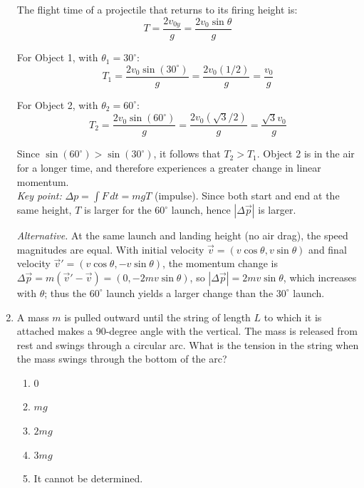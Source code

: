 \documentclass[12pt, a4paper]{article}
\begin{document}
\begin{CJK*}{UTF8}{gbsn}
\begin{enumerate}[itemsep=1.0em, topsep=0.6em]
\begin{solutionbox}
The flight time of a projectile that returns to its firing height is:
\[
T = \frac{2v_{0y}}{g} = \frac{2v_0 \sin\theta}{g}
\]

For Object 1, with $\theta_1 = 30^{\circ}$:
\[
T_1 = \frac{2v_0 \sin(30^{\circ})}{g} = \frac{2v_0(1/2)}{g} = \frac{v_0}{g}
\]

For Object 2, with $\theta_2 = 60^{\circ}$:
\[
T_2 = \frac{2v_0 \sin(60^{\circ})}{g} = \frac{2v_0(\sqrt{3}/2)}{g} = \frac{\sqrt{3}v_0}{g}
\]

Since $\sin(60^{\circ}) > \sin(30^{\circ})$, it follows that $T_2 > T_1$. Object 2 is in the air for a longer time, and therefore experiences a greater change in linear momentum.
\\
\emph{Key point:} $\Delta p=\int F\,dt=mgT$ (impulse). Since both start and end at the same height, $T$ is larger for the $60^\circ$ launch, hence $|\Delta \vec p|$ is larger.
\end{solutionbox}

\par\smallskip\textit{Alternative.} At the same launch and landing height (no air drag), the speed magnitudes are equal. With initial velocity $\vec v=(v\cos\theta, v\sin\theta)$ and final velocity $\vec v'=(v\cos\theta, -v\sin\theta)$, the momentum change is $\Delta\vec p=m(\vec v'-\vec v)=(0,-2mv\sin\theta)$, so $|\Delta\vec p|=2mv\sin\theta$, which increases with $\theta$; thus the $60^\circ$ launch yields a larger change than the $30^\circ$ launch.

\item \label{prob:2}
A mass $m$ is pulled outward until the string of length $L$ to which it is attached makes a 90-degree angle with the vertical. The mass is released from rest and swings through a circular arc. What is the tension in the string when the mass swings through the bottom of the arc?
\begin{enumerate}[label=(\Alph*)]
    \item 0
    \item $mg$
    \item $2mg$
    \item $3mg$
    \item It cannot be determined.
\end{enumerate}


\end{enumerate}
\end{CJK*}
\end{document}

